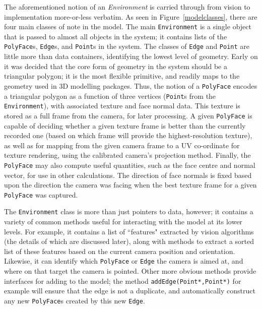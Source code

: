 \documentclass[a4paper,10pt]{report}
\begin{document}
The aforementioned notion of an \textit{Environment} is carried through from vision to implementation more-or-less verbatim. As seen in Figure~\ref{modelclasses}, there are four main classes of note in the model. The main \texttt{Environment} is a single object that is passed to almost all objects in the system; it contains lists of the \texttt{PolyFace}s, \texttt{Edge}s, and \texttt{Point}s in the system. The classes of \texttt{Edge} and \texttt{Point} are little more than data containers, identifying the lowest level of geometry. Early on it was decided that the core form of geometry in the system should be a triangular polygon; it is the most flexible primitive, and readily maps to the geometry used in 3D modelling packages. Thus, the notion of a \texttt{PolyFace} encodes a triangular polygon as a function of three vertices (\texttt{Point}s from the \texttt{Environment}), with associated texture and face normal data. This texture is stored as a full frame from the camera, for later processing. A given \texttt{PolyFace} is capable of deciding whether a given texture frame is better than the currently recorded one (based on which frame will provide the highest-resolution texture), as well as for mapping from the given camera frame to a UV co-ordinate for texture rendering, using the calibrated camera's projection method. Finally, the \texttt{PolyFace} may also compute useful quantities, such as the face centre and normal vector, for use in other calculations. The direction of face normals is fixed based upon the direction the camera was facing when the best texture frame for a given \texttt{PolyFace} was captured.

The \texttt{Environment} class is more than just pointers to data, however; it contains a variety of common methods useful for interacting with the model at its lower levels. For example, it contains a list of ``features" extracted by vision algorithms (the details of which are discussed later), along with methods to extract a sorted list of these features based on the current camera position and orientation. Likewise, it can identify which \texttt{PolyFace} or \texttt{Edge} the camera is aimed at, and where on that target the camera is pointed. Other more obvious methods provide interfaces for adding to the model; the method \texttt{addEdge(Point*,Point*)} for example will ensure that the edge is not a duplicate, and automatically construct any new \texttt{PolyFace}s created by this new \texttt{Edge}.
\end{document}
